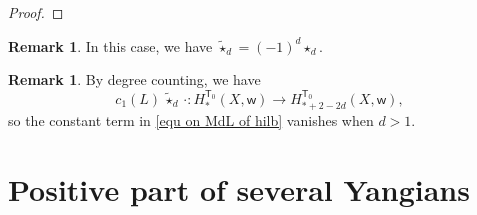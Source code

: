 \documentclass[10pt]{amsart}
\theoremstyle{definition}
\newtheorem{Remark}[Theorem]{Remark}
\numberwithin{equation}{section}
\newcommand{\vir}{\mathrm{vir}}
\newcommand{\sT}{\mathsf{T}}
\newcommand{\sw}{\mathsf{w}}
\newcommand{\ev}{\operatorname{ev}}
\begin{document}
\begin{proof}
\end{proof}

\begin{Remark}
In this case, we have $\widetilde{\star}_d=(-1)^d \star_d$.
\end{Remark}

\begin{Remark}
By degree counting, we have 
$$c_1(L)\, \widetilde{\star}_{d}\,\cdot\colon H^{\sT_0}_*(X,\sw) \to H^{\sT_0}_{*+2-2d}(X,\sw), $$ 
so the constant term in \eqref{equ on MdL of hilb} vanishes when $d>1$.
\end{Remark}











\appendix



\section{Positive part of several Yangians}
\end{document}
